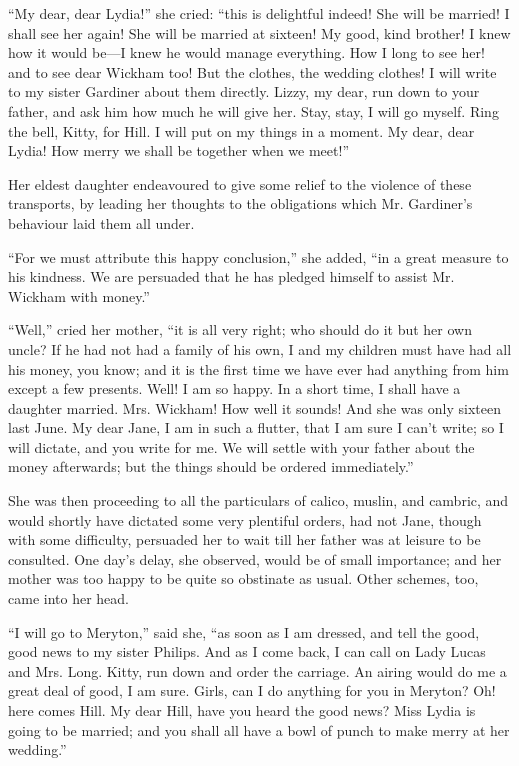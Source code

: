 \documentclass[10pt]{book}
\begin{document}
   “My dear, dear Lydia!” she cried: “this is delightful indeed! She will
be married! I shall see her again! She will be married at sixteen! My
good, kind brother! I knew how it would be—I knew he would manage
everything. How I long to see her! and to see dear Wickham too! But the
clothes, the wedding clothes! I will write to my sister Gardiner about
them directly. Lizzy, my dear, run down to your father, and ask him how
much he will give her. Stay, stay, I will go myself. Ring the bell,
Kitty, for Hill. I will put on my things in a moment. My dear, dear
Lydia! How merry we shall be together when we meet!”
  

   Her eldest daughter endeavoured to give some relief to the violence of
these transports, by leading her thoughts to the obligations which Mr.
Gardiner’s behaviour laid them all under.
  

   “For we must attribute this happy conclusion,” she added, “in a great
measure to his kindness. We are persuaded that he has pledged himself to
assist Mr. Wickham with money.”
  

   “Well,” cried her mother, “it is all very right; who should do it but
her own uncle? If he had not had a family of his own, I and my children
must have had all his money, you know; and it is the first time we have
ever had anything from him except a few presents. Well! I am so happy.
In a short time, I shall have a daughter married. Mrs. Wickham! How well
it sounds! And she was only sixteen last June. My dear Jane, I
   am in
such a flutter, that I am sure I can’t write; so I will dictate, and you
write for me. We will settle with your father about the money
afterwards; but the things should be ordered immediately.”
  

   She was then proceeding to all the particulars of calico, muslin, and
cambric, and would shortly have dictated some very plentiful orders, had
not Jane, though with some difficulty, persuaded her to wait till her
father was at leisure to be consulted. One day’s delay, she observed,
would be of small importance; and her mother was too happy to be quite
so obstinate as usual. Other schemes, too, came into her head.
  

   “I will go to Meryton,” said she, “as soon as I am dressed, and tell the
good, good news to my sister Philips. And as I come back, I can call on
Lady Lucas and Mrs. Long. Kitty, run down and order the carriage. An
airing would do me a great deal of good, I am sure. Girls, can I do
anything for you in Meryton? Oh! here comes Hill. My dear Hill, have you
heard the good news? Miss Lydia is going to be married; and you shall
all have a bowl of punch to make merry at her wedding.”
  
\end{document}
